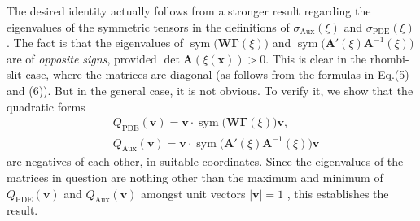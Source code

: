 \documentclass[aps,11pt,tightenlines,notitlepage,superscriptaddress,longbibliography,nofootinbib]{revtex4-1}
\DeclareMathOperator{\sign}{sign}
\DeclareMathOperator{\sym}{sym}
\begin{document}
The desired identity actually follows from a stronger result regarding the eigenvalues of the symmetric tensors in the definitions of $\sigma_\text{Aux}(\xi)$ and $\sigma_\text{PDE}(\xi)$. The fact is that the eigenvalues of $\sym \big( \mathbf{W} \boldsymbol{\Gamma}(\xi) \big)$
 and $\sym \big(\mathbf{A}'(\xi)  \mathbf{A}^{-1}(\xi)\big)$ are of \textit{opposite signs}, provided $\det \mathbf{A}(\xi(\mathbf{x})) > 0$. This is clear in the rhombi-slit case, where the matrices are diagonal (as follows from the formulas in Eq.\;(5) and (6)). But in the general case, it is not obvious. To verify it, we show that the quadratic forms 
\begin{equation}
    \begin{aligned}
    &Q_{\text{PDE}}(\mathbf{v}) = \mathbf{v} \cdot  \sym \big( \mathbf{W} \boldsymbol{\Gamma}(\xi) \big) \mathbf{v}, \\
    &Q_{\text{Aux}}(\mathbf{v}) = \mathbf{v} \cdot  \sym \big(\mathbf{A}'(\xi)  \mathbf{A}^{-1}(\xi)\big) \mathbf{v}
    \end{aligned}
\end{equation}
are negatives of each other, in suitable coordinates. Since the eigenvalues of the matrices in question are nothing other than the maximum and minimum of $Q_\text{PDE}(\mathbf{v})$ and $Q_\text{Aux}(\mathbf{v})$ amongst unit vectors $|\mathbf{v}|=1$ \cite{lax07}, this establishes the result. %
\end{document}
